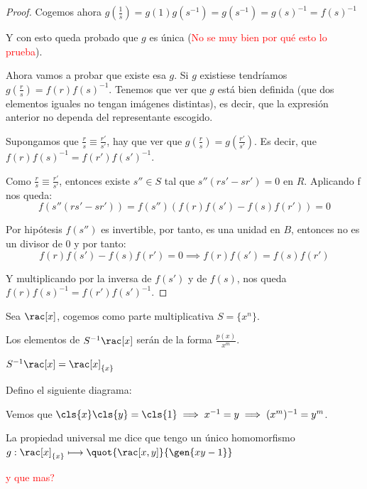 \begin{proof}
		Cogemos ahora $g(\frac{1}{s})=g(1)g(s^{-1})=g(s^{-1})=g(s)^{-1}=f(s)^{-1}$
		
		Y con esto queda probado que $g$ es única (\textcolor{red}{No se muy bien por qué esto lo prueba}).
		
		Ahora vamos a probar que existe esa $g$. Si $g$ existiese tendríamos $g\left( \frac{r}{s}\right)=f(r)f(s)^{-1}$. Tenemos que ver que $g$ está bien definida (que dos elementos iguales no tengan imágenes distintas), es decir, que la expresión anterior no dependa del representante escogido.
		
		Supongamos que $\frac{r}{s} \equiv \frac{r'}{s'}$, hay que ver que $g\left(\frac{r}{s}\right)=g\left(\frac{r'}{s'}\right)$. Es decir, que $f(r)f(s)^{-1}=f(r')f(s')^{-1}$.
		
		Como  $\frac{r}{s} \equiv \frac{r'}{s'}$, entonces existe $s'' \in S$ tal que $s''(rs'-sr')=0$ en $R$. Aplicando f nos queda:
		$$f(s''(rs'-sr'))=f(s'')\left( f(r)f(s')-f(s)f(r') \right)=0$$
		
		Por hipótesis $f(s'')$ es invertible, por tanto, es una unidad en $B$, entonces no es un divisor de 0 y por tanto:
		$$f(r)f(s')-f(s)f(r')=0 \implies f(r)f(s')=f(s)f(r')$$
		
		Y multiplicando por la inversa de $f(s')$ y de $f(s)$, nos queda $f(r)f(s)^{-1}=f(r')f(s')^{-1}$.
	\end{proof}
	
	\begin{example}
		Sea $\rac[x]$, cogemos como parte multiplicativa $S=\{x^n\}$.
		
		Los elementos de $S^{-1}\rac[x]$ serán de la forma $\frac{p(x)}{x^m}$. 
		
		\notacion $S^{-1}\rac[x]=\rac[x]_{\{x\}}$
		
		Defino el siguiente diagrama:
		
		Vemos que $\cls{x}\cls{y}=\cls{1} \implies x^{-1}=y \implies (x^m)^{-1}=y^m$.
		
		La propiedad universal me dice que tengo un único homomorfismo $g: \rac[x]_{\{x\}}\longmapsto \quot{\rac[x,y]}{\gen{xy-1}}$
		
		\textcolor{red}{ y que mas?}
	\end{example}
	

